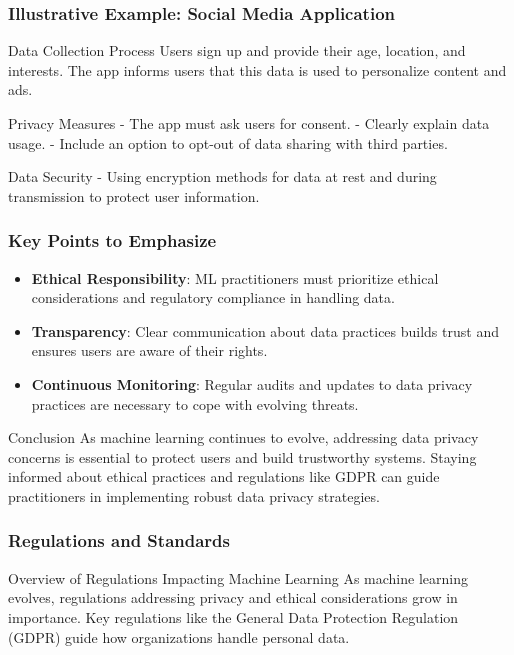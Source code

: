 \documentclass[aspectratio=169]{beamer}
\begin{document}
\begin{frame}[fragile]
    \frametitle{Illustrative Example: Social Media Application}
    \begin{block}{Data Collection Process}
        Users sign up and provide their age, location, and interests. The app informs users that this data is used to personalize content and ads.
    \end{block}
    
    \begin{block}{Privacy Measures}
        - The app must ask users for consent.
        - Clearly explain data usage.
        - Include an option to opt-out of data sharing with third parties.
    \end{block}
    
    \begin{block}{Data Security}
        - Using encryption methods for data at rest and during transmission to protect user information.
    \end{block}
\end{frame}

\begin{frame}[fragile]
    \frametitle{Key Points to Emphasize}
    \begin{itemize}
        \item \textbf{Ethical Responsibility}: ML practitioners must prioritize ethical considerations and regulatory compliance in handling data.
        \item \textbf{Transparency}: Clear communication about data practices builds trust and ensures users are aware of their rights.
        \item \textbf{Continuous Monitoring}: Regular audits and updates to data privacy practices are necessary to cope with evolving threats.
    \end{itemize}

    \begin{block}{Conclusion}
        As machine learning continues to evolve, addressing data privacy concerns is essential to protect users and build trustworthy systems. Staying informed about ethical practices and regulations like GDPR can guide practitioners in implementing robust data privacy strategies.
    \end{block}
\end{frame}

\begin{frame}[fragile]
    \frametitle{Regulations and Standards}
    \begin{block}{Overview of Regulations Impacting Machine Learning}
        As machine learning evolves, regulations addressing privacy and ethical considerations grow in importance. 
        Key regulations like the General Data Protection Regulation (GDPR) guide how organizations handle personal data.
    \end{block}
\end{frame}
\end{document}
